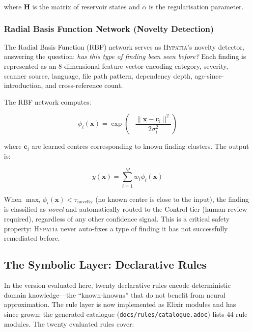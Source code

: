 \documentclass[11pt,a4paper]{article}
\begin{document}
\noindent where $\mathbf{H}$ is the matrix of reservoir states and $\alpha$ is the regularisation parameter.

\subsubsection{Radial Basis Function Network (Novelty Detection)}
\label{subsubsec:rbf}

The Radial Basis Function (RBF) network serves as \textsc{Hypatia}'s novelty detector, answering the question: \emph{has this type of finding been seen before?} Each finding is represented as an 8-dimensional feature vector encoding category, severity, scanner source, language, file path pattern, dependency depth, age-since-introduction, and cross-reference count.

The RBF network computes:

\begin{equation}
\phi_i(\mathbf{x}) = \exp\!\left( -\frac{\|\mathbf{x} - \mathbf{c}_i\|^2}{2\sigma_i^2} \right)
\label{eq:rbf}
\end{equation}

\noindent where $\mathbf{c}_i$ are learned centres corresponding to known finding clusters. The output is:

\begin{equation}
y(\mathbf{x}) = \sum_{i=1}^{M} w_i \phi_i(\mathbf{x})
\label{eq:rbf_output}
\end{equation}

When $\max_i \phi_i(\mathbf{x}) < \tau_{\text{novelty}}$ (no known centre is close to the input), the finding is classified as \emph{novel} and automatically routed to the Control tier (human review required), regardless of any other confidence signal. This is a critical safety property: \textsc{Hypatia} never auto-fixes a type of finding it has not successfully remediated before.

\subsection{The Symbolic Layer: Declarative Rules}
\label{subsec:symbolic}

In the version evaluated here, twenty declarative rules encode deterministic domain knowledge---the ``known-knowns'' that do not benefit from neural approximation. The rule layer is now implemented as Elixir modules and has since grown: the generated catalogue (\texttt{docs/rules/catalogue.adoc}) lists 44 rule modules. The twenty evaluated rules cover:
\end{document}
